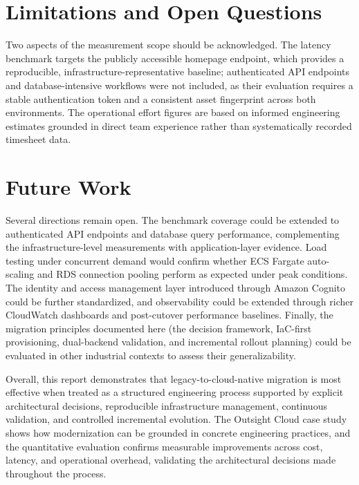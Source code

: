 \section{Limitations and Open Questions}
Two aspects of the measurement scope should be acknowledged. The latency benchmark targets the publicly accessible homepage endpoint, which provides a reproducible, infrastructure-representative baseline; authenticated API endpoints and database-intensive workflows were not included, as their evaluation requires a stable authentication token and a consistent asset fingerprint across both environments. The operational effort figures are based on informed engineering estimates grounded in direct team experience rather than systematically recorded timesheet data.

\section{Future Work}
Several directions remain open. The benchmark coverage could be extended to authenticated API endpoints and database query performance, complementing the infrastructure-level measurements with application-layer evidence. Load testing under concurrent demand would confirm whether ECS Fargate auto-scaling and RDS connection pooling perform as expected under peak conditions. The identity and access management layer introduced through Amazon Cognito could be further standardized, and observability could be extended through richer CloudWatch dashboards and post-cutover performance baselines. Finally, the migration principles documented here (the decision framework, IaC-first provisioning, dual-backend validation, and incremental rollout planning) could be evaluated in other industrial contexts to assess their generalizability.

Overall, this report demonstrates that legacy-to-cloud-native migration is most effective when treated as a structured engineering process supported by explicit architectural decisions, reproducible infrastructure management, continuous validation, and controlled incremental evolution. The Outsight Cloud case study shows how modernization can be grounded in concrete engineering practices, and the quantitative evaluation confirms measurable improvements across cost, latency, and operational overhead, validating the architectural decisions made throughout the process.
